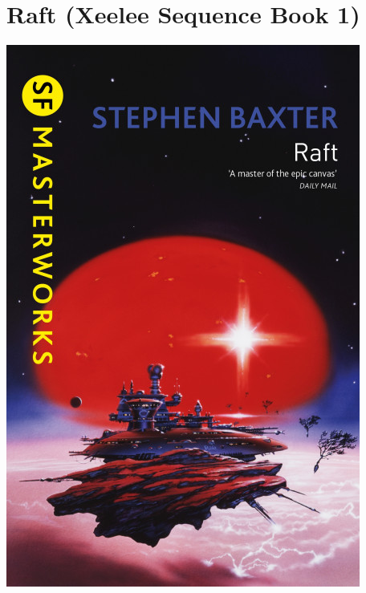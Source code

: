 \documentclass{tufte-handout}
\makeatletter
\newcommand{\varcaption}[2][0pt]{%
  \gsetlength{\@tufte@caption@vertical@offset}{-#1}%
  \gdef\@tufte@stored@varcaption{#2}%
}
\gdef\@tufte@stored@varcaption{} %
\makeatother
\begin{document}
\section*{Raft (Xeelee Sequence Book 1)}
\begin{marginfigure}[19\baselineskip]
   \includegraphics[width=\linewidth]{images/raft.jpg}
   \varcaption{\href{https://www.sfgateway.com/titles/stephen-baxter/raft/9780575127975/}{Publisher Link}, \href{https://www.amazon.com/Raft-Stephen-Baxter-author/dp/1473224055/}{Amazon Link}}
\end{marginfigure}
\end{document}
